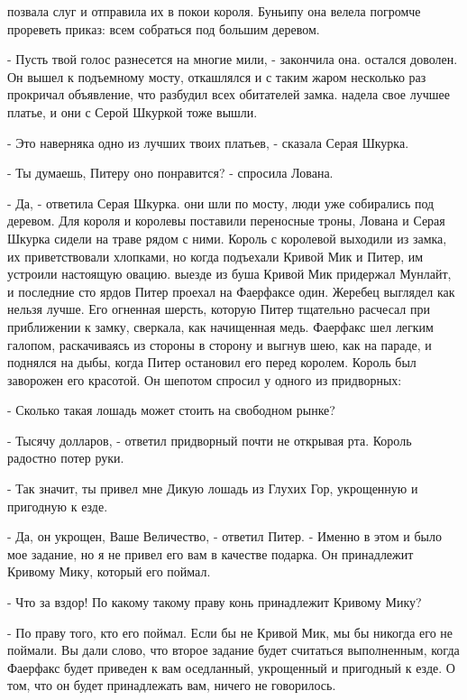  позвала слуг и отправила их в покои короля. Буньипу она 
велела погромче прореветь приказ: всем собраться под большим деревом.
\par- Пусть твой голос разнесется на многие мили, - закончила она.
 остался доволен. Он вышел к подъемному мосту, откашлялся и 
с таким жаром несколько раз прокричал объявление, что разбудил всех 
обитателей замка.
 надела свое лучшее платье, и они с Серой Шкуркой тоже 
вышли.
\par- Это наверняка одно из лучших твоих платьев, - сказала Серая 
Шкурка.
\par- Ты думаешь, Питеру оно понравится? - спросила Лована.
\par- Да, - ответила Серая Шкурка.
 они шли по мосту, люди уже собирались под деревом. Для 
короля и королевы поставили переносные троны, Лована и Серая Шкурка 
сидели на траве рядом с ними. Король с королевой выходили из замка, их 
приветствовали хлопками, но когда подъехали Кривой Мик и Питер, им 
устроили настоящую овацию.
 выезде из буша Кривой Мик придержал Мунлайт, и последние сто 
ярдов Питер проехал на Фаерфаксе один. Жеребец выглядел как нельзя 
лучше. Его огненная шерсть, которую Питер тщательно расчесал при 
приближении к замку, сверкала, как начищенная медь. Фаерфакс шел 
легким галопом, раскачиваясь из стороны в сторону и выгнув шею, как на 
параде, и поднялся на дыбы, когда Питер остановил его перед королем. 
Король был заворожен его красотой. Он шепотом спросил у одного из 
придворных:
\par- Сколько такая лошадь может стоить на свободном рынке?
\par- Тысячу долларов, - ответил придворный почти не открывая рта. 
Король радостно потер руки.
\par- Так значит, ты привел мне Дикую лошадь из Глухих Гор, укрощенную 
и пригодную к езде.
\par- Да, он укрощен, Ваше Величество, - ответил Питер. - Именно в 
этом и было мое задание, но я не привел его вам в качестве подарка. Он 
принадлежит Кривому Мику, который его поймал.
\par- Что за вздор! По какому такому праву конь принадлежит Кривому 
Мику?
\par- По праву того, кто его поймал. Если бы не Кривой Мик, мы бы 
никогда его не поймали. Вы дали слово, что второе задание будет 
считаться выполненным, когда Фаерфакс будет приведен к вам оседланный, 
укрощенный и пригодный к езде. О том, что он будет принадлежать вам, 
ничего не говорилось.
